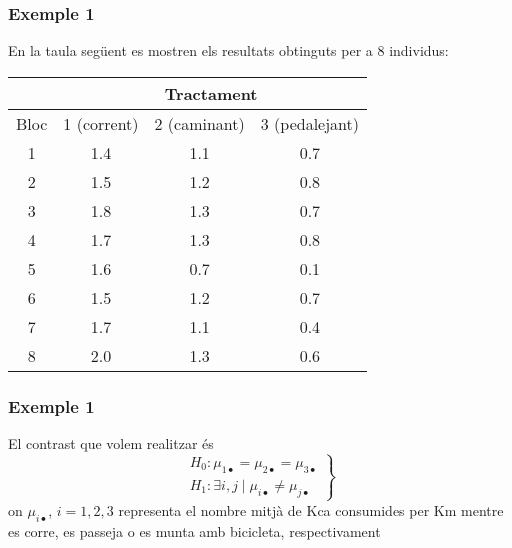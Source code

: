 \documentclass[12pt,t]{beamer}
\theoremstyle{plain}
\theoremstyle{definition}
\begin{document}
\begin{frame}
\frametitle{Exemple 1}
En la taula següent es mostren els resultats obtinguts per a 8
individus:

\begin{center}
\begin{tabular}{cccc}
\hline
&\multicolumn{3}{c}{Tractament}\\\hline
Bloc &1 (corrent) &2 (caminant)&3 (pedalejant)\\\hline
1&1.4&1.1&0.7\\
2&1.5&1.2&0.8\\
3&1.8&1.3&0.7\\
4&1.7&1.3&0.8\\
5&1.6&0.7&0.1\\
6&1.5&1.2&0.7\\
7&1.7&1.1&0.4\\
8&2.0&1.3&0.6\\\hline
\end{tabular}
\end{center}
\end{frame}


\begin{frame}
\frametitle{Exemple 1}

El contrast que volem realitzar és
$$
\left.
\begin{array}{l}
H_0 : \mu_{1\bullet} = \mu_{2\bullet} = \mu_{3\bullet} \\
H_1 : \exists i,j \mid  \mu_{i\bullet}
\not=\mu_{j\bullet}
\end{array}
\right\}
$$
on $\mu_{i\bullet}$, $i=1,2,3$ representa el nombre mitjà de Kca
consumides per Km mentre es corre, es passeja o es munta amb bicicleta,
respectivament
\end{frame}
\end{document}
